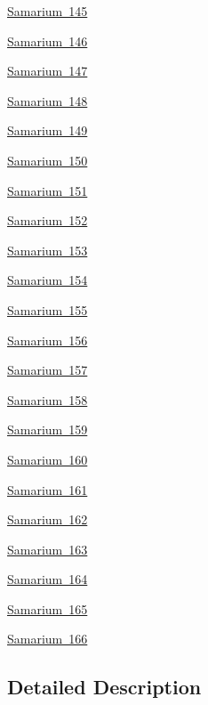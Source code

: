 \begin{DoxyCompactItemize}
\mbox{\hyperlink{group___isotope_const-_samarium-_sm145}{Samarium 145}}
\item 
\mbox{\hyperlink{group___isotope_const-_samarium-_sm146}{Samarium 146}}
\item 
\mbox{\hyperlink{group___isotope_const-_samarium-_sm147}{Samarium 147}}
\item 
\mbox{\hyperlink{group___isotope_const-_samarium-_sm148}{Samarium 148}}
\item 
\mbox{\hyperlink{group___isotope_const-_samarium-_sm149}{Samarium 149}}
\item 
\mbox{\hyperlink{group___isotope_const-_samarium-_sm150}{Samarium 150}}
\item 
\mbox{\hyperlink{group___isotope_const-_samarium-_sm151}{Samarium 151}}
\item 
\mbox{\hyperlink{group___isotope_const-_samarium-_sm152}{Samarium 152}}
\item 
\mbox{\hyperlink{group___isotope_const-_samarium-_sm153}{Samarium 153}}
\item 
\mbox{\hyperlink{group___isotope_const-_samarium-_sm154}{Samarium 154}}
\item 
\mbox{\hyperlink{group___isotope_const-_samarium-_sm155}{Samarium 155}}
\item 
\mbox{\hyperlink{group___isotope_const-_samarium-_sm156}{Samarium 156}}
\item 
\mbox{\hyperlink{group___isotope_const-_samarium-_sm157}{Samarium 157}}
\item 
\mbox{\hyperlink{group___isotope_const-_samarium-_sm158}{Samarium 158}}
\item 
\mbox{\hyperlink{group___isotope_const-_samarium-_sm159}{Samarium 159}}
\item 
\mbox{\hyperlink{group___isotope_const-_samarium-_sm160}{Samarium 160}}
\item 
\mbox{\hyperlink{group___isotope_const-_samarium-_sm161}{Samarium 161}}
\item 
\mbox{\hyperlink{group___isotope_const-_samarium-_sm162}{Samarium 162}}
\item 
\mbox{\hyperlink{group___isotope_const-_samarium-_sm163}{Samarium 163}}
\item 
\mbox{\hyperlink{group___isotope_const-_samarium-_sm164}{Samarium 164}}
\item 
\mbox{\hyperlink{group___isotope_const-_samarium-_sm165}{Samarium 165}}
\item 
\mbox{\hyperlink{group___isotope_const-_samarium-_sm166}{Samarium 166}}
\end{DoxyCompactItemize}


\subsection{Detailed Description}
